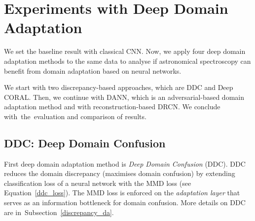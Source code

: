 \begin{table}
\begin{center}
\end{center}
\caption[Confusion matrices of the baseline model]{
	Confusion matrices of the baseline model for the source and target validation sets.
	We see the enormous error on the target domain
	where the model predicts 937 non-QSOs as QSOs and cannot identify 44 QSOs.
}
\end{table}

\section{Experiments with Deep Domain Adaptation}

We set the baseline result with classical CNN.
Now, we apply four deep domain adaptation methods to the same data
to analyse if astronomical spectroscopy can benefit from domain adaptation
based on neural networks.

We start with two discrepancy-based approaches, which are DDC and Deep CORAL.
Then, we continue with DANN, which is an adversarial-based domain adaptation method
and with reconstruction-based DRCN.
We conclude with~the~evaluation and comparison of results.

\subsection{DDC: Deep Domain Confusion}

First deep domain adaptation method is \textit{Deep Domain Confusion} (DDC).
DDC reduces the domain discrepancy (maximises domain confusion)
by extending classification loss of a neural network with the MMD loss
(see Equation~\ref{ddc_loss}).
The MMD loss is enforced on the \textit{adaptation layer}
that serves as an information bottleneck for domain confusion.
More details on DDC are in~Subsection~\ref{discrepancy_da}.


